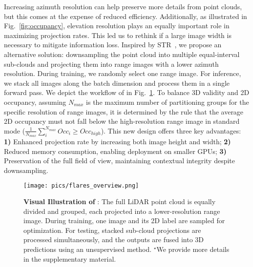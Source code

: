  Increasing azimuth resolution can help preserve more details from point clouds, but this comes at the expense of reduced efficiency. Additionally, as illustrated in Fig.~\ref{fig:occupancy}, elevation resolution plays an equally important role in maximizing projection rates. This led us to rethink if a large image width is necessary to mitigate information loss. Inspired by STR~\cite{kong2023rethinking}, we propose an alternative solution: downsampling the point cloud into multiple equal-interval sub-clouds and projecting them into range images with a lower azimuth resolution. During training, we randomly select one range image. For inference, we stack all images along the batch dimension and process them in a single forward pass. We depict the workflow of \coolname{} in Fig.~\ref{fig:overview}. To balance 3D validity and 2D occupancy, assuming $N_{max}$ is the maximum number of partitioning groups for the specific resolution of range images, it is determined by the rule that the average 2D occupancy must not fall below the high-resolution range image in standard mode ($\frac{1}{N_{max}}\sum^{N_{max}}_i Occ_{i} \geq Occ_{high}$). This new design offers three key advantages: \textbf{1)} Enhanced projection rate by increasing both image height and width; \textbf{2)} Reduced memory consumption, enabling deployment on smaller GPUs; \textbf{3)} Preservation of the full field of view, maintaining contextual integrity despite downsampling.
\begin{figure}[t]
  \centering
    \texttt{[image: pics/flares\_overview.png]}
    \caption{\textbf{Visual Illustration of \coolname{}}: The full LiDAR point cloud is equally divided and grouped, each projected into a lower-resolution range image. During training, one image and its 2D label are sampled for optimization. For testing, stacked sub-cloud projections are processed simultaneously, and the outputs are fused into 3D predictions using an unsupervised method. $^\star$We provide more details in the supplementary material.}
    \label{fig:overview}
    \vspace{-6mm}
\end{figure}

